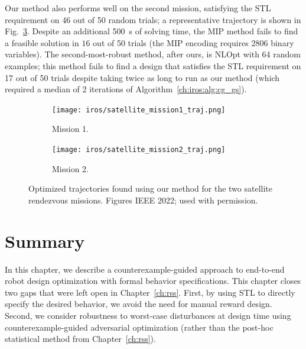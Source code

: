 Our method also performs well on the second mission, satisfying the STL requirement on 46 out of 50 random trials; a representative trajectory is shown in Fig.~\ref{ch:iros:fig:mission_2_traj}. Despite an additional \SI{500}{s} of solving time, the MIP method fails to find a feasible solution in $16$ out of 50 trials (the MIP encoding requires 2806 binary variables). The second-most-robust method, after ours, is NLOpt with 64 random examples; this method fails to find a design that satisfies the STL requirement on 17 out of 50 trials despite taking twice as long to run as our method (which required a median of 2 iterations of Algorithm~\ref{ch:iros:alg:cg_gs}).

\begin{figure}[tbh]
	\centering
	\begin{subfigure}[b]{0.45\linewidth}
		\centering
		\texttt{[image: iros/satellite\_mission1\_traj.png]}
		\caption{Mission 1.}
		\label{ch:iros:fig:mission_1_traj}
	\end{subfigure}
	\quad
	\begin{subfigure}[b]{0.45\linewidth}
		\centering
		\texttt{[image: iros/satellite\_mission2\_traj.png]}
		\caption{Mission 2.}
		\label{ch:iros:fig:mission_2_traj}
	\end{subfigure}
	\caption{Optimized trajectories found using our method for the two satellite rendezvous missions. Figures \textcopyright{} IEEE 2022; used with permission.}
\end{figure}

\section{Summary}

In this chapter, we describe a counterexample-guided approach to end-to-end robot design optimization with formal behavior specifications. This chapter closes two gaps that were left open in Chapter~\ref{ch:rss}. First, by using STL to directly specify the desired behavior, we avoid the need for manual reward design. Second, we consider robustness to worst-case disturbances at design time using counterexample-guided adversarial optimization (rather than the post-hoc statistical method from Chapter~\ref{ch:rss}).

